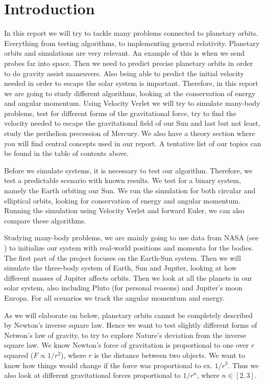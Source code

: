\documentclass[reprint, english,notitlepage,nofootinbib]{revtex4-1}  %
\begin{document}
\section{Introduction}

In this report we will try to tackle many problems connected to planetary orbits. Everything from testing algorithms, to implementing general relativity. Planetary orbits and simulations are very relevant. An example of this is when we send probes far into space. Then we need to predict precise planetary orbits in order to do gravity assist maneuvers. Also being able to predict the initial velocity needed in order to escape the solar system is important. Therefore, in this report we are going to study different algorithms, looking at the conservation of energy and angular momentum. Using Velocity Verlet we will try to simulate many-body problems, test for different forms of the gravitational force, try to find the velocity needed to escape the gravitational field of our Sun and last but not least, study the perihelion precession of Mercury. We also have a theory section where you will find central concepts used in our report. A tentative list of our topics can be found in the table of contents above.

Before we simulate systems, it is necessary to test our algorithm. Therefore, we test a predictable scenario with known results. We test for a binary system, namely the Earth orbiting our Sun. We run the simulation for both circular and elliptical orbits, looking for conservation of energy and angular momentum. Running the simulation using Velocity Verlet and forward Euler, we can also compare these algorithms.

Studying many-body problems, we are mainly going to use data from NASA (see \citep{NASA}) to initialize our system with real-world positions and momenta for the bodies. The first part of the project focuses on the Earth-Sun system. Then we will simulate the three-body system of Earth, Sun and Jupiter, looking at how different masses of Jupiter affects orbits. Then we look at all the planets in our solar system, also including Pluto (for personal reasons) and Jupiter's moon Europa. For all scenarios we track the angular momentum and energy.

As we will elaborate on below, planetary orbits cannot be completely described by Newton's inverse square law. Hence we want to test slightly different forms of Netwon's law of gravity, to try to explore Nature's deviation from the inverse square law. We know Newton's force of gravitation is proportional to one over $r$ squared ($F\propto1/r^2$), where $r$ is the distance between two objects. We want to know how things would change if the force was proportional to ex. $1/r^3$. Thus we also look at different gravitational forces proportional to $1/r^n$, where $n\in [2,3]$.
\end{document}
